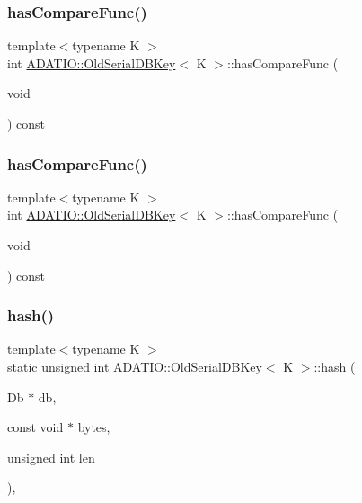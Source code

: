 \subsubsection{\texorpdfstring{hasCompareFunc()}{hasCompareFunc()}\hspace{0.1cm}{\footnotesize\ttfamily [1/2]}}
{\footnotesize\ttfamily template$<$typename K $>$ \\
int \mbox{\hyperlink{classADATIO_1_1OldSerialDBKey}{A\+D\+A\+T\+I\+O\+::\+Old\+Serial\+D\+B\+Key}}$<$ K $>$\+::has\+Compare\+Func (\begin{DoxyParamCaption}\item[{void}]{ }\end{DoxyParamCaption}) const\hspace{0.3cm}{\ttfamily [inline]}}

\mbox{\label{classADATIO_1_1OldSerialDBKey_a121b9e6811e4c16c9b05521b923b8dc7}} 
\subsubsection{\texorpdfstring{hasCompareFunc()}{hasCompareFunc()}\hspace{0.1cm}{\footnotesize\ttfamily [2/2]}}
{\footnotesize\ttfamily template$<$typename K $>$ \\
int \mbox{\hyperlink{classADATIO_1_1OldSerialDBKey}{A\+D\+A\+T\+I\+O\+::\+Old\+Serial\+D\+B\+Key}}$<$ K $>$\+::has\+Compare\+Func (\begin{DoxyParamCaption}\item[{void}]{ }\end{DoxyParamCaption}) const\hspace{0.3cm}{\ttfamily [inline]}}

\mbox{\label{classADATIO_1_1OldSerialDBKey_a35cfd22922a3cd984d6a68cce998565f}} 
\subsubsection{\texorpdfstring{hash()}{hash()}\hspace{0.1cm}{\footnotesize\ttfamily [1/2]}}
{\footnotesize\ttfamily template$<$typename K $>$ \\
static unsigned int \mbox{\hyperlink{classADATIO_1_1OldSerialDBKey}{A\+D\+A\+T\+I\+O\+::\+Old\+Serial\+D\+B\+Key}}$<$ K $>$\+::hash (\begin{DoxyParamCaption}\item[{Db $\ast$}]{db,  }\item[{const void $\ast$}]{bytes,  }\item[{unsigned int}]{len }\end{DoxyParamCaption})\hspace{0.3cm}{\ttfamily [inline]}, {\ttfamily [static]}}

